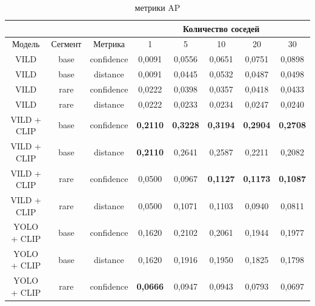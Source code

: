 \documentclass[a4paper,14pt]{article}
\begin{document}
\begin{landscape}
        \begin{table}[H]
            \centering
            \caption{метрики AP}
            \label{tab:experiments_main}
            \begin{tabular}{ccc|ccccc|}
                \cline{4-8}
                & & & \multicolumn{5}{c|}{Количество соседей} \\ \hline
                Модель              & Сегмент & Метрика    & 1               & 5               & 10              & 20              & 30              \\
                \midrule
                VILD                & base    & confidence & 0,0091          & 0,0556          & 0,0651          & 0,0751          & 0,0898          \\
                VILD                & base    & distance   & 0,0091          & 0,0445          & 0,0532          & 0,0487          & 0,0498          \\
                VILD                & rare    & confidence & 0,0222          & 0,0398          & 0,0357          & 0,0418          & 0,0433          \\
                VILD                & rare    & distance   & 0,0222          & 0,0233          & 0,0234          & 0,0247          & 0,0240          \\ \hline
                VILD + CLIP         & base    & confidence & \textbf{0,2110} & \textbf{0,3228} & \textbf{0,3194} & \textbf{0,2904} & \textbf{0,2708} \\
                VILD + CLIP         & base    & distance   & \textbf{0,2110} & 0,2641          & 0,2587          & 0,2211          & 0,2082          \\
                VILD + CLIP         & rare    & confidence & 0,0500          & 0,0967          & \textbf{0,1127} & \textbf{0,1173} & \textbf{0,1087} \\
                VILD + CLIP         & rare    & distance   & 0,0500          & 0,1071          & 0,1103          & 0,0940          & 0,0811          \\ \hline
                YOLO + CLIP         & base    & confidence & 0,1620          & 0,2102          & 0,2061          & 0,1944          & 0,1977          \\
                YOLO + CLIP         & base    & distance   & 0,1620          & 0,1916          & 0,1950          & 0,1825          & 0,1798          \\
                YOLO + CLIP         & rare    & confidence & \textbf{0,0666} & 0,0947          & 0,0943          & 0,0793          & 0,0697          \\

\end{tabular}
\end{table}
\end{landscape}
\end{document}
